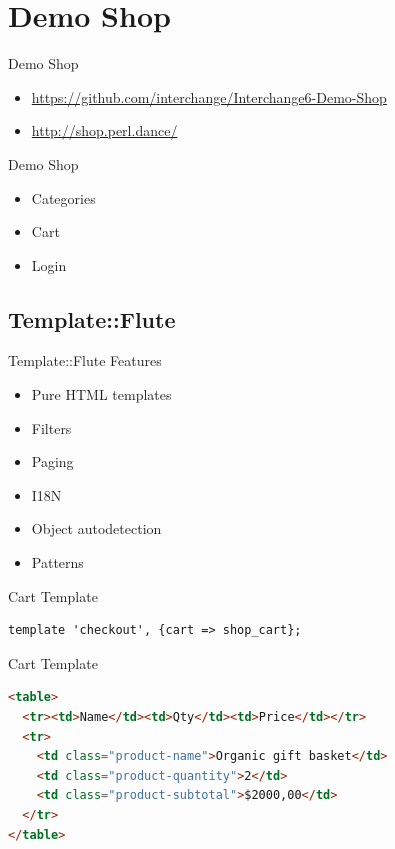 \section{Demo Shop}
\begin{frame}{Demo Shop}
\begin{itemize}
\item  \url{https://github.com/interchange/Interchange6-Demo-Shop}
\item  \url{http://shop.perl.dance/}
\end{itemize}
\end{frame}

\begin{frame}{Demo Shop}
\begin{itemize}
\item Categories
\item Cart
\item Login
\end{itemize}
\end{frame}

\subsection{Template::Flute}
\begin{frame}{Template::Flute Features}
\begin{itemize}
\item Pure HTML templates
\item Filters
\item Paging
\item I18N
\item Object autodetection
\item Patterns
\end{itemize}
\end{frame}

\begin{frame}[fragile]{Cart Template}
\begin{lstlisting}
template 'checkout', {cart => shop_cart};
\end{lstlisting}
\end{frame}

\begin{frame}[fragile]{Cart Template}
\begin{lstlisting}[language=html]
<table>
  <tr><td>Name</td><td>Qty</td><td>Price</td></tr>
  <tr>
    <td class="product-name">Organic gift basket</td>
    <td class="product-quantity">2</td>
    <td class="product-subtotal">$2000,00</td>
  </tr>
</table>
\end{lstlisting}
\end{frame}

